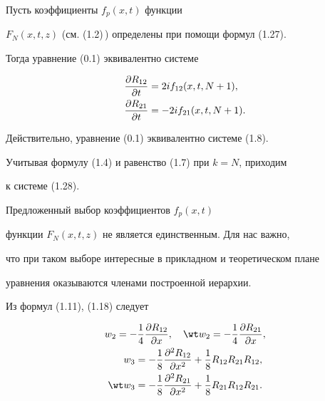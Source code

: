 \begin{cors} Пусть коэффициенты $f_p(x,t)$ функции 


$F_N(x,t,z)$ (см. (1.2)\,) определены при помощи формул (1.27). 


Тогда уравнение (0.1) эквивалентно системе 


\begin{equation} 




\begin{split} 


\myfrac{R_{12}}{t}&=2i f_{12}(x,t,N+1),\\ 


\myfrac{R_{21}}{t}&=-2i f_{21}(x,t,N+1). 


\end{split} 




\end{equation} 


\end{cors} 


 


Действительно, уравнение (0.1) эквивалентно системе (1.8). 


Учитывая формулу (1.4) и равенство (1.7) при $k=N$, приходим 


к системе (1.28). 


 


\begin{notes} Предложенный выбор коэффициентов $f_p(x,t)$ 


функции $F_N(x,t,z)$ не является единственным. Для нас важно, 


что при таком выборе интересные в прикладном и теоретическом плане 


уравнения оказываются членами построенной иерархии. 


\end{notes} 


 


Из формул (1.11), (1.18) следует 


\begin{gather} 


w_2=-\frac{1}{4}\myfrac{R_{12}}{x},\quad 


\wt w_2=-\frac{1}{4}\myfrac{R_{21}}{x},\\ 


\begin{align} 


w_3&=-\frac{1}{8}\myfrac{^2R_{12}}{x^2}+\frac{1}{8} 


R_{12}R_{21}R_{12},\\ 


\wt w_3&=-\frac{1}{8}\myfrac{^2 R_{21}}{x^2}+ 


\frac{1}{8}R_{21}R_{12}R_{21}. 


\end{align} 


\end{gather} 


